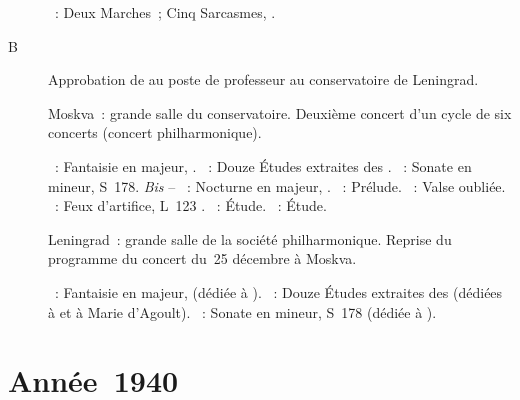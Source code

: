 \begin{description}
 \textsc{\Prokofiev{}}~: Deux Marches~; Cinq Sarcasmes, .
 \item[B\DateWithWeekDay{1939-12-17}]
 Approbation de \VSofronitsky{} au poste de professeur au conservatoire de
 Leningrad.
 \item[\DateWithWeekDay{1939-12-25}]
 Moskva~: grande salle du conservatoire.
 Deuxième concert d'un cycle de six concerts (concert philharmonique).

 \textsc{\Schumann{}}~: Fantaisie en \kC majeur, .
 \textsc{\Chopin{}}~: Douze Études extraites des .
 \textsc{\Liszt{}}~: Sonate en \kB mineur, S~178.
 \emph{Bis} -- \textsc{\Chopin{}}~: Nocturne en \kF \Sharp majeur, 
 .
 \textsc{\JBach{}}~: Prélude.
 \textsc{\Liszt{}}~: Valse oubliée.
 \textsc{\Debussy{}}~: Feux d'artifice, L~123 .
 \textsc{\Scriabine{}}~: Étude.
 \textsc{\Chopin{}}~: Étude.
 \item[\DateWithWeekDay{1939-12-29}]
 Leningrad~: grande salle de la société philharmonique.
 Reprise du programme du concert du~25 décembre à Moskva.

 \textsc{\Schumann{}}~: Fantaisie en \kC majeur,  (dédiée à
 \FLiszt{}).
 \textsc{\Chopin{}}~: Douze Études extraites des  (dédiées à
 \FLiszt{} et à Marie d'Agoult).
 \textsc{\Liszt{}}~: Sonate en \kB mineur, S~178 (dédiée à \RSchumann{}).
\end{description}

\section{Année~1940}

